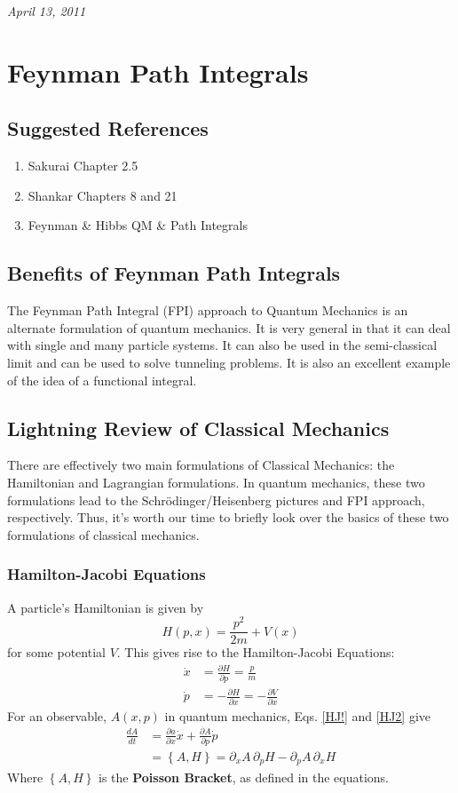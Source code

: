 \documentclass{article}
\begin{document}
	\noindent \textit{April 13, 2011}
	
	\section{Feynman Path Integrals}
	\subsection{Suggested References}
	\begin{enumerate}
		\item Sakurai Chapter 2.5
		\item Shankar Chapters 8 and 21
		\item Feynman \& Hibbs QM \& Path Integrals
	\end{enumerate}	
	\subsection{Benefits of Feynman Path Integrals}
	The Feynman Path Integral (FPI) approach to Quantum Mechanics is an alternate formulation of quantum mechanics. It is very general in that it can deal with single and many particle systems. It can also be used in the semi-classical limit and can be used to solve tunneling problems. It is also an excellent example of the idea of a functional integral.
	\subsection{Lightning Review of Classical Mechanics}
	There are effectively two main formulations of Classical Mechanics: the Hamiltonian and Lagrangian formulations. In quantum mechanics, these two formulations lead to the Schr\"odinger/Heisenberg pictures and FPI approach, respectively. Thus, it's worth our time to briefly look over the basics of these two formulations of classical mechanics.
	\subsubsection{Hamilton-Jacobi Equations}
	A particle's Hamiltonian is given by
	$$H(p,x)=\frac{p^2}{2m}+V(x)$$
	for some potential $V$. This gives rise to the Hamilton-Jacobi Equations:
	\begin{eqnarray}
	\label{HJ1}\dot{x}&=\frac{\partial H}{\partial p}=\frac{p}{m}\\
	\label{HJ2}\dot{p}&=-\frac{\partial H}{\partial x}=-\frac{\partial V}{\partial x}
	\end{eqnarray}
	For an observable, $A(x,p)$ in quantum mechanics, Eqs. \eqref{HJ!} and \eqref{HJ2} give
	\begin{align*}
		\frac{dA}{dt}&=\frac{\partial a}{\partial x}\dot{x}+\frac{\partial A}{\partial p}\dot{p}\\
					 &=\left\{A,H\right\}=\partial_xA\,\partial_p H-\partial_p A\,\partial_x H
	\end{align*}
	Where $\left\{A,H\right\}$ is the \textbf{Poisson Bracket}, as defined in the equations.
\end{document}
